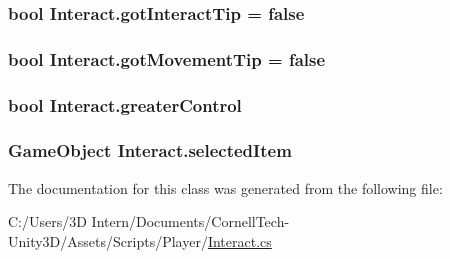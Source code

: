 \subsubsection[{\texorpdfstring{got\+Interact\+Tip}{gotInteractTip}}]{\setlength{\rightskip}{0pt plus 5cm}bool Interact.\+got\+Interact\+Tip = false}\hypertarget{class_interact_a573a72a394e3090b5c5101f09355440e}{}\label{class_interact_a573a72a394e3090b5c5101f09355440e}
\subsubsection[{\texorpdfstring{got\+Movement\+Tip}{gotMovementTip}}]{\setlength{\rightskip}{0pt plus 5cm}bool Interact.\+got\+Movement\+Tip = false}\hypertarget{class_interact_a6101651539a035a925e1b7c7b7277cb1}{}\label{class_interact_a6101651539a035a925e1b7c7b7277cb1}
\subsubsection[{\texorpdfstring{greater\+Control}{greaterControl}}]{\setlength{\rightskip}{0pt plus 5cm}bool Interact.\+greater\+Control}\hypertarget{class_interact_ac05d4c2cfb44a97362f395a41c2423f8}{}\label{class_interact_ac05d4c2cfb44a97362f395a41c2423f8}
\subsubsection[{\texorpdfstring{selected\+Item}{selectedItem}}]{\setlength{\rightskip}{0pt plus 5cm}Game\+Object Interact.\+selected\+Item}\hypertarget{class_interact_a77b739c7a3a440059f1d655871e609e7}{}\label{class_interact_a77b739c7a3a440059f1d655871e609e7}


The documentation for this class was generated from the following file\+:\begin{DoxyCompactItemize}
\item 
C\+:/\+Users/3\+D Intern/\+Documents/\+Cornell\+Tech-\/\+Unity3\+D/\+Assets/\+Scripts/\+Player/\hyperlink{_interact_8cs}{Interact.\+cs}\end{DoxyCompactItemize}
